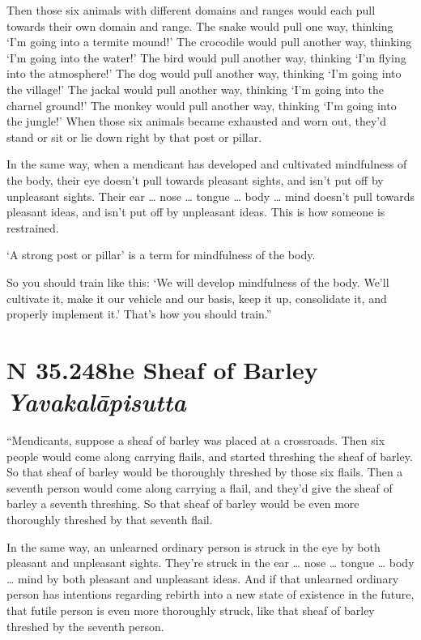 \documentclass[12pt,openany]{book}%
\newcommand*{\suttatitleacronym}[1]{\smaller[2]{#1}\vspace*{.3em}}
\newcommand*{\suttatitletranslation}[1]{\linebreak{#1}}
\newcommand*{\suttatitleroot}[1]{\linebreak\smaller[2]\itshape{#1}}
\newcommand*{\tocacronym}[1]{\hspace*{-3.3em}{#1}\quad}
\newcommand*{\toctranslation}[1]{#1}
\newcommand*{\tocroot}[1]{(\textit{#1})}
\begin{document}
Then those six animals with different domains and ranges would each pull towards their own domain and range. The snake would pull one way, thinking ‘I’m going into a termite mound!’ The crocodile would pull another way, thinking ‘I’m going into the water!’ The bird would pull another way, thinking ‘I’m flying into the atmosphere!’ The dog would pull another way, thinking ‘I’m going into the village!’ The jackal would pull another way, thinking ‘I’m going into the charnel ground!’ The monkey would pull another way, thinking ‘I’m going into the jungle!’ When those six animals became exhausted and worn out, they’d stand or sit or lie down right by that post or pillar. 

In the same way, when a mendicant has developed and cultivated mindfulness of the body, their eye doesn’t pull towards pleasant sights, and isn’t put off by unpleasant sights. Their ear … nose … tongue … body … mind doesn’t pull towards pleasant ideas, and isn’t put off by unpleasant ideas. This is how someone is restrained. 

‘A strong post or pillar’ is a term for mindfulness of the body. 

So you should train like this: ‘We will develop mindfulness of the body. We’ll cultivate it, make it our vehicle and our basis, keep it up, consolidate it, and properly implement it.’ That’s how you should train.” 

%
\section*{{\suttatitleacronym SN 35.248}{\suttatitletranslation The Sheaf of Barley }{\suttatitleroot Yavakalāpisutta}}
\addcontentsline{toc}{section}{\tocacronym{SN 35.248} \toctranslation{The Sheaf of Barley } \tocroot{Yavakalāpisutta}}

“Mendicants, suppose a sheaf of barley was placed at a crossroads. Then six people would come along carrying flails, and started threshing the sheaf of barley. So that sheaf of barley would be thoroughly threshed by those six flails. Then a seventh person would come along carrying a flail, and they’d give the sheaf of barley a seventh threshing. So that sheaf of barley would be even more thoroughly threshed by that seventh flail. 

In the same way, an unlearned ordinary person is struck in the eye by both pleasant and unpleasant sights. They’re struck in the ear … nose … tongue … body … mind by both pleasant and unpleasant ideas. And if that unlearned ordinary person has intentions regarding rebirth into a new state of existence in the future, that futile person is even more thoroughly struck, like that sheaf of barley threshed by the seventh person. 
\end{document}
